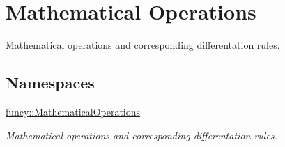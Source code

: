 \hypertarget{group__MathematicalOperationsGroup}{\section{Mathematical Operations}
\label{group__MathematicalOperationsGroup}
}


Mathematical operations and corresponding differentation rules.  


\subsection*{Namespaces}
\begin{DoxyCompactItemize}
\item 
\hyperlink{namespacefuncy_1_1MathematicalOperations}{funcy\-::\-Mathematical\-Operations}
\begin{DoxyCompactList}\small\item\em Mathematical operations and corresponding differentation rules. \end{DoxyCompactList}\end{DoxyCompactItemize}
